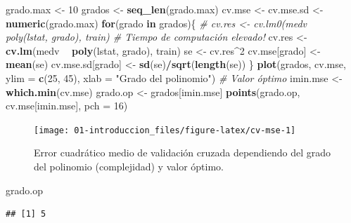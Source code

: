 \documentclass[
  spanish,
]{book}
\newenvironment{Shaded}{\begin{snugshade}}{\end{snugshade}}
\newcommand{\CommentTok}[1]{\textcolor[rgb]{0.56,0.35,0.01}{\textit{#1}}}
\newcommand{\ControlFlowTok}[1]{\textcolor[rgb]{0.13,0.29,0.53}{\textbf{#1}}}
\newcommand{\DataTypeTok}[1]{\textcolor[rgb]{0.13,0.29,0.53}{#1}}
\newcommand{\DecValTok}[1]{\textcolor[rgb]{0.00,0.00,0.81}{#1}}
\newcommand{\KeywordTok}[1]{\textcolor[rgb]{0.13,0.29,0.53}{\textbf{#1}}}
\newcommand{\NormalTok}[1]{#1}
\newcommand{\OperatorTok}[1]{\textcolor[rgb]{0.81,0.36,0.00}{\textbf{#1}}}
\newcommand{\StringTok}[1]{\textcolor[rgb]{0.31,0.60,0.02}{#1}}
\theoremstyle{break}
\theoremstyle{definition}
\theoremstyle{definition}
\theoremstyle{definition}
\theoremstyle{remark}
\begin{document}
\begin{Shaded}
\begin{Highlighting}[]
\NormalTok{grado.max <-}\StringTok{ }\DecValTok{10}
\NormalTok{grados <-}\StringTok{ }\KeywordTok{seq_len}\NormalTok{(grado.max) }
\NormalTok{cv.mse <-}\StringTok{ }\NormalTok{cv.mse.sd <-}\StringTok{ }\KeywordTok{numeric}\NormalTok{(grado.max)}
\ControlFlowTok{for}\NormalTok{(grado }\ControlFlowTok{in}\NormalTok{ grados)\{}
  \CommentTok{# cv.res <- cv.lm0(medv ~ poly(lstat, grado), train) # Tiempo de computación elevado!}
\NormalTok{  cv.res <-}\StringTok{ }\KeywordTok{cv.lm}\NormalTok{(medv }\OperatorTok{~}\StringTok{ }\KeywordTok{poly}\NormalTok{(lstat, grado), train)}
\NormalTok{  se <-}\StringTok{ }\NormalTok{cv.res}\OperatorTok{^}\DecValTok{2}
\NormalTok{  cv.mse[grado] <-}\StringTok{ }\KeywordTok{mean}\NormalTok{(se)}
\NormalTok{  cv.mse.sd[grado] <-}\StringTok{ }\KeywordTok{sd}\NormalTok{(se)}\OperatorTok{/}\KeywordTok{sqrt}\NormalTok{(}\KeywordTok{length}\NormalTok{(se))}
\NormalTok{\}}
\KeywordTok{plot}\NormalTok{(grados, cv.mse, }\DataTypeTok{ylim =} \KeywordTok{c}\NormalTok{(}\DecValTok{25}\NormalTok{, }\DecValTok{45}\NormalTok{),}
  \DataTypeTok{xlab =} \StringTok{"Grado del polinomio"}\NormalTok{)}
\CommentTok{# Valor óptimo}
\NormalTok{imin.mse <-}\StringTok{ }\KeywordTok{which.min}\NormalTok{(cv.mse)}
\NormalTok{grado.op <-}\StringTok{ }\NormalTok{grados[imin.mse]}
\KeywordTok{points}\NormalTok{(grado.op, cv.mse[imin.mse], }\DataTypeTok{pch =} \DecValTok{16}\NormalTok{)}
\end{Highlighting}
\end{Shaded}

\begin{figure}[!htb]

{\centering \texttt{[image: 01-introduccion\_files/figure-latex/cv-mse-1]} 

}

\caption{Error cuadrático medio de validación cruzada dependiendo del grado del polinomio (complejidad) y valor óptimo.}\label{fig:cv-mse}
\end{figure}

\begin{Shaded}
\begin{Highlighting}[]
\NormalTok{grado.op}
\end{Highlighting}
\end{Shaded}

\begin{verbatim}
## [1] 5
\end{verbatim}
\end{document}
